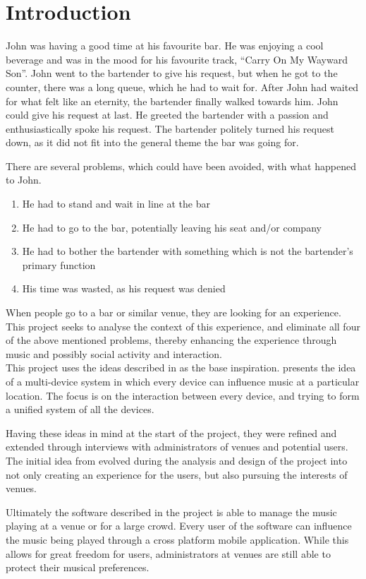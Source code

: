\chapter{Introduction}\label{introduction} John was having a good time
at his favourite bar. He was enjoying a cool beverage and was in the
mood for his favourite track, \enquote{Carry On My Wayward Son}. John
went to the bartender to give his request, but when he got to the
counter, there was a long queue, which he had to wait for. After John
had waited for what felt like an eternity, the bartender finally walked
towards him. John could give his request at last. He greeted the
bartender with a passion and enthusiastically spoke his request. The
bartender politely turned his request down, as it did not fit into the
general theme the bar was going for.

There are several problems, which could have been avoided, with what
happened to John.
\begin{enumerate}
	\item He had to stand and wait in line at the bar
	\item He had to go to the bar, potentially leaving his seat and/or
company
	\item He had to bother the bartender with something which is
not the bartender's primary function
	\item His time was wasted, as his request was denied
\end{enumerate}

When people go to a bar or similar venue, they are looking for an
experience. This project seeks to analyse the context of this
experience, and eliminate all four of the above mentioned problems,
thereby enhancing the experience through music and possibly social
activity and interaction.\\

This project uses the ideas described in \cite{sorensen2012} as the
base inspiration. \cite{sorensen2012} presents the idea of a multi-device system in
which every device can influence music at a particular location. The
focus is on the interaction between every device, and trying to form a
unified system of all the devices.

Having these ideas in mind at the start of the
project, they were refined and extended through interviews with
administrators of venues and potential users. The initial idea from
\cite{sorensen2012} evolved during the analysis and design of the
project into not only creating an experience for the users, but also
pursuing the interests of venues.

Ultimately the software described in the project is able to manage
the music playing at a venue or for a large crowd. Every user of the
software can influence the music being played through a cross platform
mobile application. While this allows for great freedom for users,
administrators at venues are still able to protect their musical
preferences.
